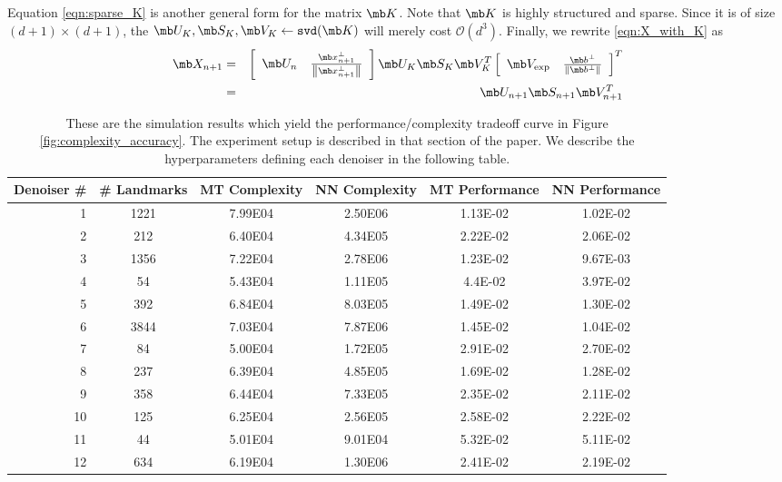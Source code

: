 Equation \eqref{eqn:sparse_K} is another general form for the matrix $\mb K$. Note that $\mb K$ is highly structured and sparse\cite{brand2006fast}. Since it is of size $(d +1) \times (d + 1)$, the $\mb U_K, \mb S_K, \mb V_K \leftarrow \texttt{svd}(\mb K)$ will merely cost $\mathcal{O} (d^3)$.
Finally, we rewrite \eqref{eqn:X_with_K} as
\begin{eqnarray}
    \mb X_{n+1} &=& \left[ \begin{array}{cc} \mb U_n & \frac{\mb x_{n+1}^\perp}{\left \|\mb x_{n+1}^\perp \right \|} \end{array} \right] \mb U_K \mb S_K \mb V_K^T \left[ \begin{array}{cc} \mb V_{\text{exp}} & \frac{\mb b^\perp}{\left \|\mb b^\perp \right \|} \end{array} \right]^T \\
    &=& \mb U_{n+1} \mb S_{n+1} \mb V_{n+1}^T
\end{eqnarray}



\begin{table}[t]
\caption{These are the simulation results which yield the performance/complexity tradeoff curve in Figure \ref{fig:complexity_accuracy}. The experiment setup is described in that section of the paper. We describe the hyperparameters defining each denoiser in the following table.}
\label{complexity_accuracy_table}
\vskip 0.15in
\begin{center}
\begin{small}
\begin{sc}
\begin{tabular}{rccccc}
\toprule
Denoiser \# & \# Landmarks & MT Complexity & NN Complexity & MT Performance & NN Performance \\
\midrule
1 & 1221 & 7.99E04 & 2.50E06 & 1.13E-02 & 1.02E-02 \\
2 & 212 & 6.40E04 & 4.34E05 & 2.22E-02 & 2.06E-02 \\
3 & 1356 & 7.22E04 & 2.78E06 & 1.23E-02 & 9.67E-03 \\
4 & 54 & 5.43E04 & 1.11E05 & 4.4E-02 & 3.97E-02 \\
5 & 392 & 6.84E04 & 8.03E05 & 1.49E-02 & 1.30E-02 \\
6 & 3844 & 7.03E04 & 7.87E06 & 1.45E-02 & 1.04E-02 \\
7 & 84 & 5.00E04 & 1.72E05 & 2.91E-02 & 2.70E-02 \\
8 & 237 & 6.39E04 & 4.85E05 & 1.69E-02 & 1.28E-02 \\
9 & 358 & 6.44E04 & 7.33E05 & 2.35E-02 & 2.11E-02 \\
10 & 125 & 6.25E04 & 2.56E05 & 2.58E-02 & 2.22E-02 \\
11 & 44 & 5.01E04 & 9.01E04 & 5.32E-02 & 5.11E-02 \\
12 & 634 & 6.19E04 & 1.30E06 & 2.41E-02 & 2.19E-02 \\
\bottomrule
\end{tabular}
\end{sc}
\end{small}
\end{center}
\vskip -0.1in
\end{table}


